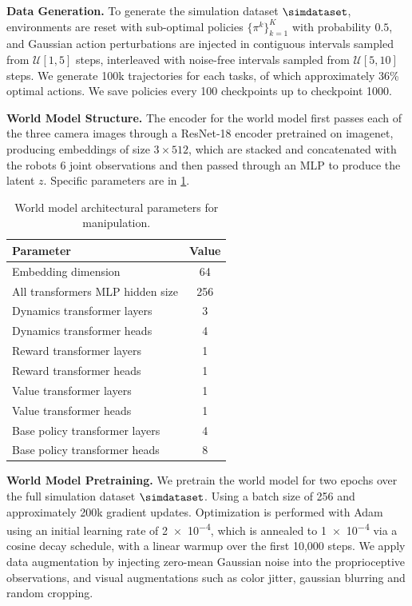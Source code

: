 \textbf{Data Generation.} To generate the simulation dataset $\simdataset$, environments are reset with sub-optimal policies $\{\pi^k\}_{k=1}^K$ with probability $0.5$, and Gaussian action perturbations are injected in contiguous intervals sampled from $\mathcal{U}[1, 5]$ steps, interleaved with noise-free intervals sampled from $\mathcal{U}[5, 10]$ steps. We generate 100k trajectories for each tasks, of which approximately 36\% optimal actions. We save policies every 100 checkpoints up to checkpoint 1000. 


\textbf{World Model Structure.} The encoder for the world model first passes each of the three camera images through a ResNet-18 encoder pretrained on imagenet, producing embeddings of size $3 
\times 512$, which are stacked and concatenated with the robots 6 joint observations and then passed through an MLP to produce the latent $z$. Specific parameters are in  \cref{tab:model_man}.


\begin{table}[htb]
\caption{\footnotesize{World model architectural parameters for manipulation.}}
\centering
\begin{tabular}{lc}
\hline
Parameter & Value \\
\hline
Embedding dimension & 64 \\
All transformers MLP hidden size & 256 \\
Dynamics transformer layers & 3 \\
Dynamics transformer heads & 4 \\
Reward transformer layers & 1 \\
Reward transformer heads & 1 \\
Value transformer layers & 1 \\
Value transformer heads & 1 \\
Base policy transformer layers & 4 \\
Base policy transformer heads & 8 \\
\hline
\end{tabular}
\vspace{0.05cm}
\label{tab:model_man}
\end{table}




\textbf{World Model Pretraining.}
We pretrain the world model for two epochs over the full simulation dataset $\simdataset$. Using a batch size of 256 and approximately 200k gradient updates. Optimization is performed with Adam using an initial learning rate of \num{2e-4}, which is annealed to \num{1e-4} via a cosine decay schedule, with a linear warmup over the first 10{,}000 steps. We apply data augmentation by injecting zero-mean Gaussian noise into the proprioceptive observations, and visual augmentations such as color jitter,  gaussian blurring and random cropping. 


